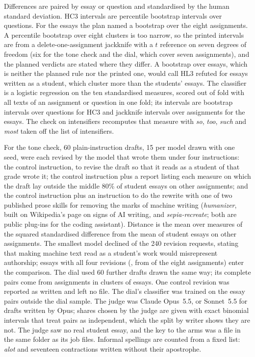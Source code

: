 {Differences are paired by essay or question and standardised by the human standard deviation. HC3 intervals are percentile bootstrap intervals over questions. For the essays the plan named a bootstrap over the eight assignments. A percentile bootstrap over eight clusters is too narrow, so the printed intervals are from a delete-one-assignment jackknife with a $t$ reference on seven degrees of freedom (six for the tone check and the dial, which cover seven assignments), and the planned verdicts are stated where they differ. A bootstrap over essays, which is neither the planned rule nor the printed one, would call HL3 refuted for essays written as a student, which cluster more than the students' essays. The classifier is a logistic regression on the ten standardised measures, scored out of fold with all texts of an assignment or question in one fold; its intervals are bootstrap intervals over questions for HC3 and jackknife intervals over assignments for the essays. The check on intensifiers recomputes that measure with \emph{so}, \emph{too}, \emph{such} and \emph{most} taken off the list of intensifiers.

For the tone check, 60 plain-instruction drafts, 15 per model drawn with one seed, were each revised by the model that wrote them under four instructions: the control instruction, to revise the draft so that it reads as a student of that grade wrote it; the control instruction plus a report listing each measure on which the draft lay outside the middle 80\% of student essays on other assignments; and the control instruction plus an instruction to do the rewrite with one of two published prose skills for removing the marks of machine writing (\emph{humanizer}, built on Wikipedia's page on signs of AI writing, and \emph{sepia-recreate}; both are public plug-ins for the coding assistant). Distance is the mean over measures of the squared standardised difference from the mean of student essays on other assignments. The smallest model declined \rvDeclined{} of the 240 revision requests, stating that making machine text read as a student's work would misrepresent authorship; essays with all four revisions (\rvN, from \rvAssignments{} of the eight assignments) enter the comparison. The dial used 60 further drafts drawn the same way; its \dlN{} complete pairs come from \dlAssignments{} assignments in clusters of \dlClusters{} essays. One control revision was reported as written and left no file. The dial's classifier was trained on the \dlTrain{} essay pairs outside the dial sample. The judge was Claude Opus~5.5, or Sonnet~5.5 for drafts written by Opus; shares chosen by the judge are given with exact binomial intervals that treat pairs as independent, which the split by writer shows they are not. The judge saw no real student essay, and the key to the arms was a file in the same folder as its job files. Informal spellings are counted from a fixed list: \emph{alot} and seventeen contractions written without their apostrophe.}

